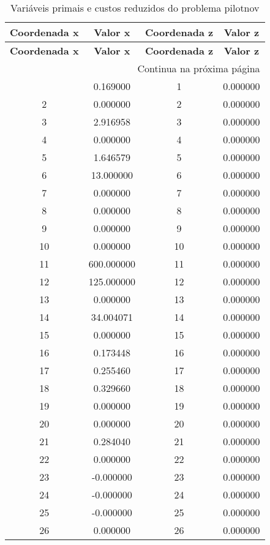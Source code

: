 \documentclass[12pt]{article}
\begin{document}
\begin{longtable}{@{}cccc@{}}
\caption{Variáveis primais e custos reduzidos do problema pilotnov} \\
\toprule
\textbf{Coordenada x} & \textbf{Valor x} & \textbf{Coordenada z} & \textbf{Valor z} \\
\midrule
\endfirsthead

\toprule
\textbf{Coordenada x} & \textbf{Valor x} & \textbf{Coordenada z} & \textbf{Valor z} \\
\midrule
\endhead

\midrule \multicolumn{4}{r}{{Continua na próxima página}} \\ \midrule
\endfoot

\bottomrule
\endlastfoot
1 & 0.169000 & 1 & 0.000000 \\
2 & 0.000000 & 2 & 0.000000 \\
3 & 2.916958 & 3 & 0.000000 \\
4 & 0.000000 & 4 & 0.000000 \\
5 & 1.646579 & 5 & 0.000000 \\
6 & 13.000000 & 6 & 0.000000 \\
7 & 0.000000 & 7 & 0.000000 \\
8 & 0.000000 & 8 & 0.000000 \\
9 & 0.000000 & 9 & 0.000000 \\
10 & 0.000000 & 10 & 0.000000 \\
11 & 600.000000 & 11 & 0.000000 \\
12 & 125.000000 & 12 & 0.000000 \\
13 & 0.000000 & 13 & 0.000000 \\
14 & 34.004071 & 14 & 0.000000 \\
15 & 0.000000 & 15 & 0.000000 \\
16 & 0.173448 & 16 & 0.000000 \\
17 & 0.255460 & 17 & 0.000000 \\
18 & 0.329660 & 18 & 0.000000 \\
19 & 0.000000 & 19 & 0.000000 \\
20 & 0.000000 & 20 & 0.000000 \\
21 & 0.284040 & 21 & 0.000000 \\
22 & 0.000000 & 22 & 0.000000 \\
23 & -0.000000 & 23 & 0.000000 \\
24 & -0.000000 & 24 & 0.000000 \\
25 & -0.000000 & 25 & 0.000000 \\
26 & 0.000000 & 26 & 0.000000 \\

\end{longtable}
\end{document}

